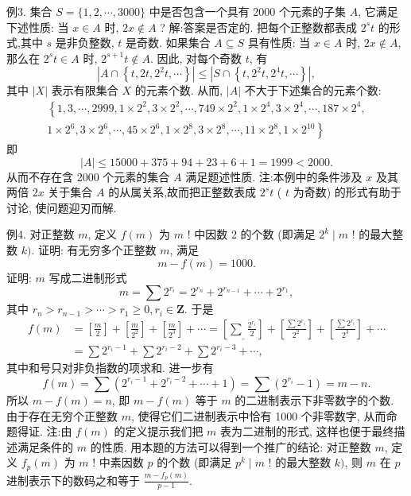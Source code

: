 例3. 集合 $S=\{1,2, \cdots, 3000\}$ 中是否包含一个具有 2000 个元素的子集 $A$, 它满足下述性质: 当 $x \in A$ 时, $2 x \notin A$ ?
解:答案是否定的.
把每个正整数都表成 $2^s t$ 的形式,其中 $s$ 是非负整数, $t$ 是奇数.
如果集合 $A \subseteq S$ 具有性质: 当 $x \in A$ 时, $2 x \notin A$, 那么在 $2^s t \in A$ 时, $2^{s+1} t \notin A$. 因此, 对每个奇数 $t$, 有
$$
\left|A \cap\left\{t, 2 t, 2^2 t, \cdots\right\}\right| \leqslant\left|S \cap\left\{t, 2^2 t, 2^4 t, \cdots\right\}\right|,
$$
其中 $|X|$ 表示有限集合 $X$ 的元素个数.
从而, $|A|$ 不大于下述集合的元素个数:
$$
\begin{gathered}
\left\{1,3, \cdots, 2999,1 \times 2^2, 3 \times 2^2, \cdots, 749 \times 2^2, 1 \times 2^4, 3 \times 2^4, \cdots, 187 \times 2^4,\right. \\
\left.1 \times 2^6, 3 \times 2^6, \cdots, 45 \times 2^6, 1 \times 2^8, 3 \times 2^8, \cdots, 11 \times 2^8, 1 \times 2^{10}\right\}
\end{gathered}
$$
即
$$
|A| \leqslant 15000+375+94+23+6+1=1999<2000 .
$$
从而不存在含 2000 个元素的集合 $A$ 满足题述性质.
注:本例中的条件涉及 $x$ 及其两倍 $2 x$ 关于集合 $A$ 的从属关系,故而把正整数表成 $2^s t$ ( $t$ 为奇数) 的形式有助于讨论, 使问题迎刃而解.



例4. 对正整数 $m$, 定义 $f(m)$ 为 $m$ ! 中因数 2 的个数 (即满足 $2^k \mid m$ ! 的最大整数 $k)$. 证明: 有无穷多个正整数 $m$, 满足
$$
m-f(m)=1000 .
$$
证明: $m$ 写成二进制形式
$$
m=\sum 2^{r_i}=2^{r_n}+2^{r_{n-1}}+\cdots+2^{r_1},
$$
其中 $r_n>r_{n-1}>\cdots>r_1 \geqslant 0, r_i \in \mathbf{Z}$.
于是
$$
\begin{aligned}
f(m) & =\left[\frac{m}{2}\right]+\left[\frac{m}{2^2}\right]+\left[\frac{m}{2^3}\right]+\cdots=\left[\underline{\sum} \frac{2^{r_i}}{2}\right]+\left[\frac{\sum 2^{r_i}}{2^2}\right]+\left[\frac{\sum 2^{r_i}}{2^3}\right]+\cdots \\
& =\sum 2^{r_i-1}+\sum 2^{r_i-2}+\sum 2^{r_i-3}+\cdots,
\end{aligned}
$$
其中和号只对非负指数的项求和.
进一步有
$$
f(m)=\sum\left(2^{r_i-1}+2^{r_i-2}+\cdots+1\right)=\sum\left(2^{r_i}-1\right)=m-n .
$$
所以 $m-f(m)=n$, 即 $m-f(m)$ 等于 $m$ 的二进制表示下非零数字的个数.
由于存在无穷个正整数 $m$, 使得它们二进制表示中恰有 1000 个非零数字, 从而命题得证.
注:由 $f(m)$ 的定义提示我们把 $m$ 表为二进制的形式, 这样也便于最终描述满足条件的 $m$ 的性质.
用本题的方法可以得到一个推广的结论:
对正整数 $m$, 定义 $f_p(m)$ 为 $m$ ! 中素因数 $p$ 的个数 (即满足 $p^k \mid m$ ! 的最大整数 $k)$, 则 $m$ 在 $p$ 进制表示下的数码之和等于 $\frac{m-f_p(m)}{p-1}$.



